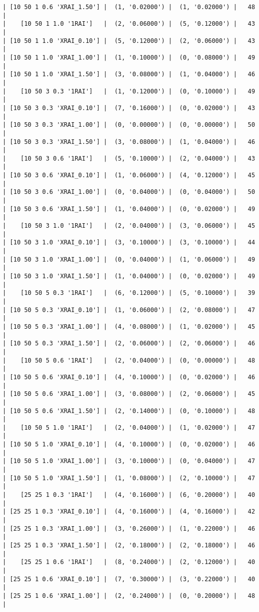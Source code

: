 \documentclass{article}
\begin{document}
\begin{verbatim}
| [10 50 1 0.6 'XRAI_1.50'] |  (1, '0.02000') |  (1, '0.02000') |   48  |
|    [10 50 1 1.0 '1RAI']   |  (2, '0.06000') |  (5, '0.12000') |   43  |
| [10 50 1 1.0 'XRAI_0.10'] |  (5, '0.12000') |  (2, '0.06000') |   43  |
| [10 50 1 1.0 'XRAI_1.00'] |  (1, '0.10000') |  (0, '0.08000') |   49  |
| [10 50 1 1.0 'XRAI_1.50'] |  (3, '0.08000') |  (1, '0.04000') |   46  |
|    [10 50 3 0.3 '1RAI']   |  (1, '0.12000') |  (0, '0.10000') |   49  |
| [10 50 3 0.3 'XRAI_0.10'] |  (7, '0.16000') |  (0, '0.02000') |   43  |
| [10 50 3 0.3 'XRAI_1.00'] |  (0, '0.00000') |  (0, '0.00000') |   50  |
| [10 50 3 0.3 'XRAI_1.50'] |  (3, '0.08000') |  (1, '0.04000') |   46  |
|    [10 50 3 0.6 '1RAI']   |  (5, '0.10000') |  (2, '0.04000') |   43  |
| [10 50 3 0.6 'XRAI_0.10'] |  (1, '0.06000') |  (4, '0.12000') |   45  |
| [10 50 3 0.6 'XRAI_1.00'] |  (0, '0.04000') |  (0, '0.04000') |   50  |
| [10 50 3 0.6 'XRAI_1.50'] |  (1, '0.04000') |  (0, '0.02000') |   49  |
|    [10 50 3 1.0 '1RAI']   |  (2, '0.04000') |  (3, '0.06000') |   45  |
| [10 50 3 1.0 'XRAI_0.10'] |  (3, '0.10000') |  (3, '0.10000') |   44  |
| [10 50 3 1.0 'XRAI_1.00'] |  (0, '0.04000') |  (1, '0.06000') |   49  |
| [10 50 3 1.0 'XRAI_1.50'] |  (1, '0.04000') |  (0, '0.02000') |   49  |
|    [10 50 5 0.3 '1RAI']   |  (6, '0.12000') |  (5, '0.10000') |   39  |
| [10 50 5 0.3 'XRAI_0.10'] |  (1, '0.06000') |  (2, '0.08000') |   47  |
| [10 50 5 0.3 'XRAI_1.00'] |  (4, '0.08000') |  (1, '0.02000') |   45  |
| [10 50 5 0.3 'XRAI_1.50'] |  (2, '0.06000') |  (2, '0.06000') |   46  |
|    [10 50 5 0.6 '1RAI']   |  (2, '0.04000') |  (0, '0.00000') |   48  |
| [10 50 5 0.6 'XRAI_0.10'] |  (4, '0.10000') |  (0, '0.02000') |   46  |
| [10 50 5 0.6 'XRAI_1.00'] |  (3, '0.08000') |  (2, '0.06000') |   45  |
| [10 50 5 0.6 'XRAI_1.50'] |  (2, '0.14000') |  (0, '0.10000') |   48  |
|    [10 50 5 1.0 '1RAI']   |  (2, '0.04000') |  (1, '0.02000') |   47  |
| [10 50 5 1.0 'XRAI_0.10'] |  (4, '0.10000') |  (0, '0.02000') |   46  |
| [10 50 5 1.0 'XRAI_1.00'] |  (3, '0.10000') |  (0, '0.04000') |   47  |
| [10 50 5 1.0 'XRAI_1.50'] |  (1, '0.08000') |  (2, '0.10000') |   47  |
|    [25 25 1 0.3 '1RAI']   |  (4, '0.16000') |  (6, '0.20000') |   40  |
| [25 25 1 0.3 'XRAI_0.10'] |  (4, '0.16000') |  (4, '0.16000') |   42  |
| [25 25 1 0.3 'XRAI_1.00'] |  (3, '0.26000') |  (1, '0.22000') |   46  |
| [25 25 1 0.3 'XRAI_1.50'] |  (2, '0.18000') |  (2, '0.18000') |   46  |
|    [25 25 1 0.6 '1RAI']   |  (8, '0.24000') |  (2, '0.12000') |   40  |
| [25 25 1 0.6 'XRAI_0.10'] |  (7, '0.30000') |  (3, '0.22000') |   40  |
| [25 25 1 0.6 'XRAI_1.00'] |  (2, '0.24000') |  (0, '0.20000') |   48  |

\end{verbatim}
\end{document}
